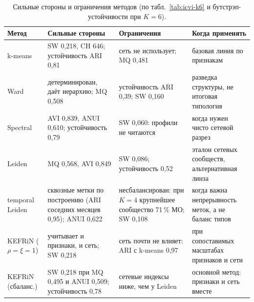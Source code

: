 \documentclass[11pt,a4paper]{article}
\begin{document}
\begin{table}[htbp]
\centering\small
\caption{Сильные стороны и ограничения методов (по табл.~\ref{tab:icvi-k6} и бутстрэп-устойчивости при $K=6$).}
\label{tab:methods-pros}
\begin{tabularx}{\textwidth}{>{\raggedright\arraybackslash\hspace{0pt}}p{2.3cm}YYY}
\toprule
Метод & Сильные стороны & Ограничения & Когда применять \\
\midrule
k-means & SW 0,218, CH 646; устойчивость ARI 0,81 & сеть не использует; MQ 0,481 & базовая линия по признакам \\
Ward & детерминирован, даёт иерархию; MQ 0,508 & устойчивость ARI 0,39; SW 0,160 & разведка структуры, не итоговая типология \\
Spectral & AVI 0,839, ANUI 0,610; устойчивость 0,79 & SW 0,060: профили не читаются & когда нужен чисто сетевой разрез \\
Leiden & MQ 0,568, AVI 0,849 & SW 0,086; устойчивость 0,52 & эталон сетевых сообществ, альтернативная линза \\
temporal Leiden & сквозные метки по построению (ARI соседних месяцев 0,95); ANUI 0,622 & несбалансирован: при $K=4$ крупнейшее сообщество 71\,\% МО; SW 0,108 & когда важна непрерывность меток, а не баланс типов \\
KEFRiN ($\rho=\xi=1$) & учитывает и признаки, и сеть; SW 0,218 & сеть почти не влияет: ARI с k-means 0,97 & при сопоставимых масштабах признаков и сети \\
KEFRiN (сбаланс.) & SW 0,218 при MQ 0,495 и ANUI 0,509; устойчивость 0,78 & сетевые индексы ниже, чем у Leiden & основной метод: признаки и сеть вместе \\
\bottomrule
\end{tabularx}
\end{table}
\end{document}
